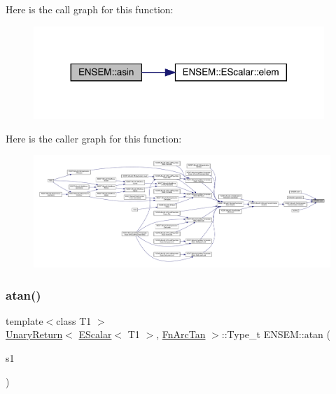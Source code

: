 Here is the call graph for this function\+:\nopagebreak
\begin{figure}[H]
\begin{center}
\leavevmode
\includegraphics[width=311pt]{d4/dca/group__escalar_gab463bdb3f1fadf6b5a87076e5d3dc9b9_cgraph}
\end{center}
\end{figure}
Here is the caller graph for this function\+:\nopagebreak
\begin{figure}[H]
\begin{center}
\leavevmode
\includegraphics[width=350pt]{d4/dca/group__escalar_gab463bdb3f1fadf6b5a87076e5d3dc9b9_icgraph}
\end{center}
\end{figure}
\mbox{\label{group__escalar_ga3169598490417ab5713660967ec6b658}} 
\subsubsection{\texorpdfstring{atan()}{atan()}}
{\footnotesize\ttfamily template$<$class T1 $>$ \\
\mbox{\hyperlink{structENSEM_1_1UnaryReturn}{Unary\+Return}}$<$ \mbox{\hyperlink{classENSEM_1_1EScalar}{E\+Scalar}}$<$ T1 $>$, \mbox{\hyperlink{structENSEM_1_1FnArcTan}{Fn\+Arc\+Tan}} $>$\+::Type\+\_\+t E\+N\+S\+E\+M\+::atan (\begin{DoxyParamCaption}\item[{const \mbox{\hyperlink{classENSEM_1_1EScalar}{E\+Scalar}}$<$ T1 $>$ \&}]{s1 }\end{DoxyParamCaption})\hspace{0.3cm}{\ttfamily [inline]}}

